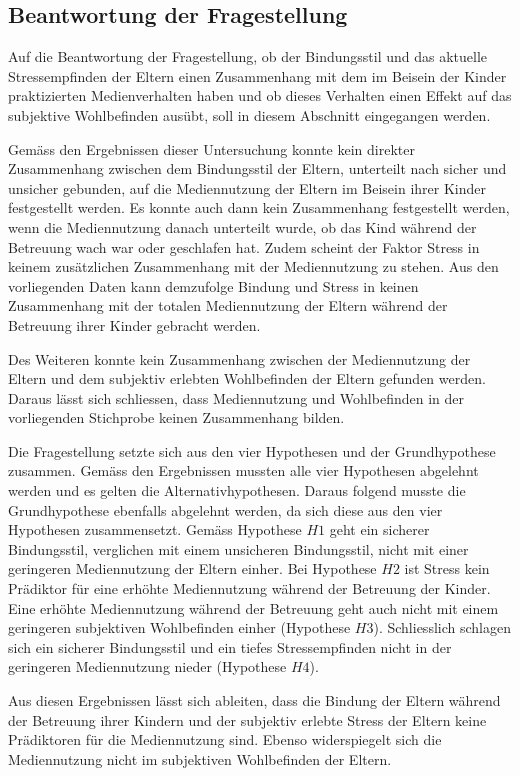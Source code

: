 \subsection{Beantwortung der Fragestellung} \label{sec:BeantwortungFragestellung}
Auf die Beantwortung der Fragestellung, ob der Bindungsstil und das aktuelle Stressempfinden der Eltern einen Zusammenhang mit dem im Beisein der Kinder praktizierten Medienverhalten haben und ob dieses Verhalten einen Effekt auf das subjektive Wohlbefinden ausübt, soll in diesem Abschnitt eingegangen werden.

Gemäss den Ergebnissen dieser Untersuchung konnte kein direkter Zusammenhang zwischen dem Bindungsstil der Eltern, unterteilt nach sicher und unsicher gebunden, auf die Mediennutzung der Eltern im Beisein ihrer Kinder festgestellt werden. Es konnte auch dann kein Zusammenhang festgestellt werden, wenn die Mediennutzung danach unterteilt wurde, ob das Kind während der Betreuung wach war oder geschlafen hat. Zudem scheint der Faktor Stress in keinem zusätzlichen Zusammenhang mit der Mediennutzung zu stehen. Aus den vorliegenden Daten kann demzufolge Bindung und Stress in keinen Zusammenhang mit der totalen Mediennutzung der Eltern während der Betreuung ihrer Kinder gebracht werden.

Des Weiteren konnte kein Zusammenhang zwischen der Mediennutzung der Eltern und dem subjektiv erlebten Wohlbefinden der Eltern gefunden werden. Daraus lässt sich schliessen, dass Mediennutzung und Wohlbefinden in der vorliegenden Stichprobe keinen Zusammenhang bilden.

Die Fragestellung setzte sich aus den vier Hypothesen und der Grundhypothese zusammen. Gemäss den Ergebnissen mussten alle vier Hypothesen abgelehnt werden und es gelten die Alternativhypothesen. Daraus folgend musste die Grundhypothese ebenfalls abgelehnt werden, da sich diese aus den vier Hypothesen zusammensetzt. Gemäss Hypothese $H1$ geht ein sicherer Bindungsstil, verglichen mit einem unsicheren Bindungsstil, nicht mit einer geringeren Mediennutzung der Eltern einher. Bei Hypothese $H2$ ist Stress kein Prädiktor für eine erhöhte Mediennutzung während der Betreuung der Kinder. Eine erhöhte Mediennutzung während der Betreuung geht auch nicht mit einem geringeren subjektiven Wohlbefinden einher (Hypothese $H3$). Schliesslich schlagen sich ein sicherer Bindungsstil und ein tiefes Stressempfinden nicht in der geringeren Mediennutzung nieder (Hypothese $H4$).

Aus diesen Ergebnissen lässt sich ableiten, dass die Bindung der Eltern während der Betreuung ihrer Kindern und der subjektiv erlebte Stress der Eltern keine Prädiktoren für die Mediennutzung sind. Ebenso widerspiegelt sich die Mediennutzung nicht im subjektiven Wohlbefinden der Eltern.

